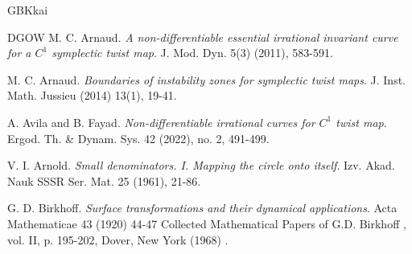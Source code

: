 \documentclass{amsart}
\theoremstyle{definition}
\begin{document}
\begin{CJK*}{GBK}{kai}
\begin{thebibliography}{DGOW}
			 M. C. Arnaud. {\it A non-differentiable essential irrational invariant curve for a $C^1$ symplectic twist map}. J. Mod. Dyn. 5(3) (2011), 583-591.
			


 M. C. Arnaud. {\it Boundaries of instability zones for symplectic twist maps}. J. Inst. Math. Jussieu (2014) 13(1), 19-41.

			
			
			
			 A. Avila and B. Fayad. {\it Non-differentiable irrational curves for  $C^1$  twist map}.
			Ergod.
			Th. \& Dynam. Sys. 42 (2022), no. 2, 491-499.
			
			  V. I. Arnold. {\it  Small denominators. I. Mapping the circle onto itself}.
			Izv. Akad. Nauk SSSR Ser. Mat. 25 (1961), 21-86.
			
			
			
			 G. D. Birkhoff.  {\it Surface transformations and their dynamical applications}.
			Acta Mathematicae 43 (1920) 44-47 Collected Mathematical Papers
			of G.D. Birkhoff , vol. II, p. 195-202, Dover, New York (1968) .
			
			
			
			
			

\end{thebibliography}
\end{CJK*}
\end{document}
